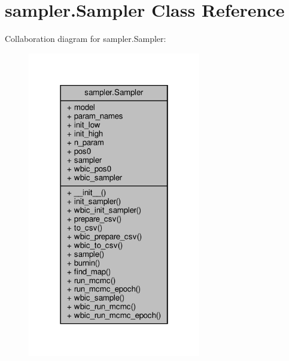 \hypertarget{classsampler_1_1Sampler}{}\section{sampler.\+Sampler Class Reference}
\label{classsampler_1_1Sampler}


Collaboration diagram for sampler.\+Sampler\+:\nopagebreak
\begin{figure}[H]
\begin{center}
\leavevmode
\includegraphics[width=214pt]{de/d63/classsampler_1_1Sampler__coll__graph}
\end{center}
\end{figure}
